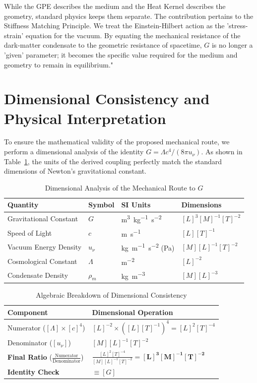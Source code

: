 \documentclass[11pt,a4paper]{article}
\begin{document}
While the GPE describes the medium and the Heat Kernel describes the geometry, standard physics keeps them separate. The contribution pertains to the Stiffness Matching Principle. We treat the Einstein-Hilbert action as the 'stress-strain' equation for the vacuum. By equating the mechanical resistance of the dark-matter condensate to the geometric resistance of spacetime, $G$ is no longer a 'given' parameter; it becomes the specific value required for the medium and geometry to remain in equilibrium."

\section{Dimensional Consistency and Physical Interpretation}

To ensure the mathematical validity of the proposed mechanical route, we perform a dimensional analysis of the identity $G = \Lambda c^4 / (8\pi u_\nu)$. As shown in Table~\ref{tab:dimensions}, the units of the derived coupling perfectly match the standard dimensions of Newton's gravitational constant.

\begin{table}[h]
\centering
\caption{Dimensional Analysis of the Mechanical Route to $G$}
\label{tab:dimensions}
\vspace{2mm}
\begin{tabular}{@{}llll@{}}
\toprule
\textbf{Quantity} & \textbf{Symbol} & \textbf{SI Units} & \textbf{Dimensions} \\ \midrule
Gravitational Constant & $G$ & \si{m^3.kg^{-1}.s^{-2}} & $[L]^3 [M]^{-1} [T]^{-2}$ \\
Speed of Light & $c$ & \si{m.s^{-1}} & $[L] [T]^{-1}$ \\
Vacuum Energy Density & $u_\nu$ & \si{kg.m^{-1}.s^{-2}} (Pa) & $[M] [L]^{-1} [T]^{-2}$ \\
Cosmological Constant & $\Lambda$ & \si{m^{-2}} & $[L]^{-2}$ \\
Condensate Density & $\rho_m$ & \si{kg.m^{-3}} & $[M] [L]^{-3}$ \\ \bottomrule
\end{tabular}
\end{table}

\begin{table}[h]
\centering
\caption{Algebraic Breakdown of Dimensional Consistency}
\label{tab:algebraic_dims}
\vspace{2mm}
\begin{tabular}{@{}ll@{}}
\toprule
\textbf{Component} & \textbf{Dimensional Operation} \\ \midrule
Numerator ($[\Lambda] \times [c]^4$) & $[L]^{-2} \times ([L][T]^{-1})^4 = [L]^2 [T]^{-4}$ \\ \addlinespace
Denominator ($[u_\nu]$) & $[M] [L]^{-1} [T]^{-2}$ \\ \addlinespace
\textbf{Final Ratio} ($\frac{\text{Numerator}}{\text{Denominator}}$) & $\frac{[L]^2 [T]^{-4}}{[M] [L]^{-1} [T]^{-2}} = \mathbf{[L]^3 [M]^{-1} [T]^{-2}}$ \\ \midrule
\textbf{Identity Check} & $\equiv [G]$ \\ \bottomrule
\end{tabular}
\end{table}
\end{document}
